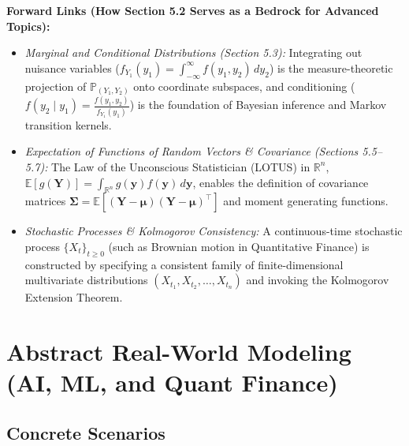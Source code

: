 \documentclass[11pt, letterpaper]{article}
\theoremstyle{definition}
\theoremstyle{remark}
\begin{document}
\textbf{Forward Links (How Section 5.2 Serves as a Bedrock for Advanced Topics):}
\begin{itemize}
    \item \emph{Marginal and Conditional Distributions (Section 5.3):} Integrating out nuisance variables ($f_{Y_1}(y_1) = \int_{-\infty}^\infty f(y_1, y_2)\,dy_2$) is the measure-theoretic projection of $\mathbb{P}_{(Y_1, Y_2)}$ onto coordinate subspaces, and conditioning ($f(y_2 \mid y_1) = \frac{f(y_1, y_2)}{f_{Y_1}(y_1)}$) is the foundation of Bayesian inference and Markov transition kernels.
    \item \emph{Expectation of Functions of Random Vectors \& Covariance (Sections 5.5--5.7):} The Law of the Unconscious Statistician (LOTUS) in $\mathbb{R}^n$, $\mathbb{E}[g(\mathbf{Y})] = \int_{\mathbb{R}^n} g(\mathbf{y}) f(\mathbf{y})\,d\mathbf{y}$, enables the definition of covariance matrices $\mathbf{\Sigma} = \mathbb{E}[(\mathbf{Y}-\boldsymbol{\mu})(\mathbf{Y}-\boldsymbol{\mu})^\top]$ and moment generating functions.
    \item \emph{Stochastic Processes \& Kolmogorov Consistency:} A continuous-time stochastic process $\{X_t\}_{t \ge 0}$ (such as Brownian motion in Quantitative Finance) is constructed by specifying a consistent family of finite-dimensional multivariate distributions $(X_{t_1}, X_{t_2}, \dots, X_{t_n})$ and invoking the Kolmogorov Extension Theorem.
\end{itemize}

\newpage

\section{Abstract Real-World Modeling (AI, ML, and Quant Finance)}

\subsection{Concrete Scenarios}
\end{document}
